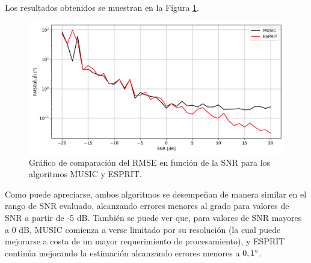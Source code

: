 Los resultados obtenidos se muestran en la Figura \ref{fig:doaest_error_vs_snr}.
\begin{figure}[ht!]
    \centering
    \includegraphics[width=0.9\linewidth]{images/03-DOAEst/error_vs_snr.png}
    \caption{Gráfico de comparación del RMSE en función de la SNR para los algoritmos MUSIC y ESPRIT.}
    \label{fig:doaest_error_vs_snr}
\end{figure}

Como puede apreciarse, ambos algoritmos se desempeñan de manera similar en el rango de SNR evaluado, alcanzando errores menores al grado para valores de SNR a partir de -5 dB. También se puede ver que, para valores de SNR mayores a 0 dB, MUSIC comienza a verse limitado por su resolución (la cual puede mejorarse a costa de un mayor requerimiento de procesamiento), y ESPRIT continúa mejorando la estimación alcanzando errores menores a $0,1^{\circ}$.

